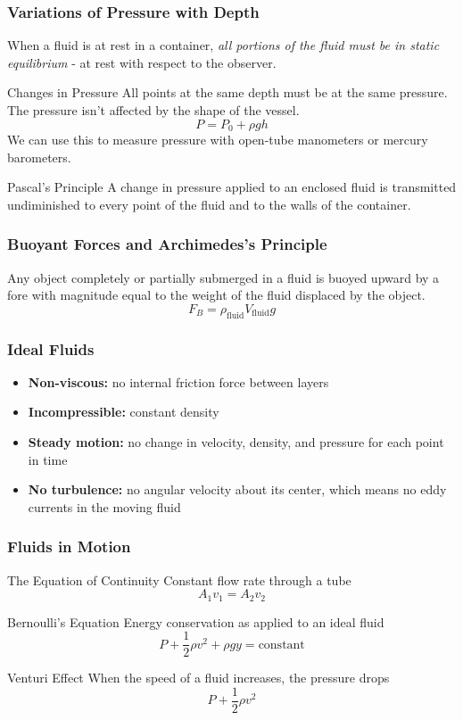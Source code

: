 \documentclass[letterpaper]{beamer}
\begin{document}
\begin{frame}
\frametitle{Variations of Pressure with Depth}

When a fluid is at rest in a container, \emph{all portions of the fluid must be in static equilibrium} - at rest with respect to the observer.

\begin{block}{Changes in Pressure}
All points at the same depth must be at the same pressure. The pressure isn't affected by the shape of the vessel.
$$P = P_0 + \rho gh$$
We can use this to measure pressure with open-tube manometers or mercury barometers.
\end{block}

\begin{block}{Pascal's Principle}
A change in pressure applied to an enclosed fluid is transmitted undiminished to every point of the fluid and to the walls of the container.
\end{block}

\end{frame}

\begin{frame}
\frametitle{Buoyant Forces and Archimedes's Principle}

Any object completely or partially submerged in a fluid is buoyed upward by a fore with magnitude equal to the weight of the fluid displaced by the object.
$$F_B = \rho_\text{fluid}V_\text{fluid}g$$
\end{frame}

\begin{frame}
\frametitle{Ideal Fluids}

\begin{itemize}
\item \textbf{Non-viscous:} no internal friction force between layers
\item \textbf{Incompressible:} constant density
\item \textbf{Steady motion:} no change in velocity, density, and pressure for each point in time
\item \textbf{No turbulence:} no angular velocity about its center, which means no eddy currents in the moving fluid
\end{itemize}
\end{frame}

\begin{frame}
\frametitle{Fluids in Motion}

\begin{block}{The Equation of Continuity}
Constant flow rate through a tube
$$A_1v_1 = A_2v_2$$
\end{block}

\begin{block}{Bernoulli's Equation}
Energy conservation as applied to an ideal fluid
$$P + \frac{1}{2}\rho v^2 + \rho gy = \text{constant}$$
\end{block}

\begin{block}{Venturi Effect}
When the speed of a fluid increases, the pressure drops
$$P + \frac{1}{2}\rho v^2$$
\end{block}
\end{frame}
\end{document}
